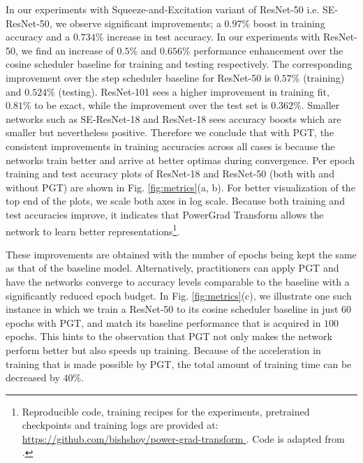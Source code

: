 \documentclass[times,sort&compress]{elsarticle}
\begin{document}
In our experiments with Squeeze-and-Excitation variant of ResNet-50 i.e.
SE-ResNet-50\cite{hu2018squeeze}, we observe significant improvements; a $0.97\%$ boost
in training accuracy and a $0.734\%$ increase in test accuracy. In our experiments with
ResNet-50, we find an increase of $0.5\%$ and $0.656\%$ performance enhancement over the
cosine scheduler baseline for training and testing respectively. The corresponding
improvement over the step scheduler baseline for ResNet-50 is $0.57\%$ (training) and
$0.524\%$ (testing). ResNet-101 sees a higher improvement in training fit, $0.81\%$ to
be exact, while the improvement over the test set is $0.362\%$. Smaller networks such as
SE-ResNet-18 and ResNet-18 sees accuracy boosts which are smaller but nevertheless
positive. Therefore we conclude that with PGT, the consistent improvements in training
accuracies across all cases is because the networks train better and arrive at better
optimas during convergence. Per epoch training and test accuracy plots of ResNet-18 and
ResNet-50 (both with and without PGT) are shown in Fig. \ref{fig:metrics}(a, b). For
better visualization of the top end of the plots, we scale both axes in log scale.
Because both training and test accuracies improve, it indicates that PowerGrad Transform
allows the network to learn better representations\footnote{Reproducible code, training
recipes for the experiments, pretrained checkpoints and training logs are provided at:
\\
\url{ https://github.com/bishshoy/power-grad-transform }. Code is adapted from
\cite{rw2019timm}.}.


These improvements are obtained with the number of epochs being kept the same as that of
the baseline model. Alternatively, practitioners can apply PGT and have the networks
converge to accuracy levels comparable to the baseline with a significantly reduced
epoch budget. In Fig. \ref{fig:metrics}(c), we illustrate one such instance in which we
train a ResNet-50 to its cosine scheduler baseline in just $60$ epochs with PGT, and
match its baseline performance that is acquired in $100$ epochs. This hints to the
observation that PGT not only makes the network perform better but also speeds up
training. Because of the acceleration in training that is made possible by PGT, the
total amount of training time can be decreased by $40\%$.
\end{document}
